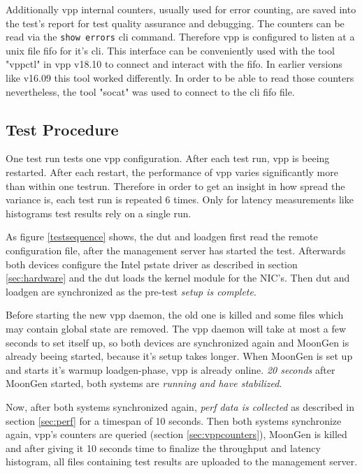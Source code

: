 Additionally \Ac{vpp} internal counters, usually used for error
counting, are saved into the test's report for test quality assurance
and debugging. The counters can be read via the \lstinline|show
errors|  \Ac{cli} command. Therefore \Ac{vpp} is configured to listen
at a unix file fifo for it's \Ac{cli}. This interface can be
conveniently used with the tool "vppctl" in \Ac{vpp} v18.10 to connect
and interact with the fifo. In earlier versions like v16.09 this tool
worked differently. In order to be able to read those counters
nevertheless, the tool "socat" was used to connect to the \Ac{cli}
fifo file.


\subsection{Test Procedure}

One test run tests one \Ac{vpp} configuration. After each test run,
\Ac{vpp} is beeing restarted. After each restart, the performance of
\Ac{vpp} varies significantly more than within one testrun. Therefore
in order to get an insight in how spread the variance is, each test
run is repeated 6 times. Only for latency measurements like histograms
test results rely on a single run.

As figure \ref{testsequence} shows, the \Ac{dut} and \Ac{loadgen}
first read the remote configuration file, after the management server
has started the test. Afterwards both devices configure the Intel
pstate driver  as described in section \ref{sec:hardware} and the
\Ac{dut} loads the kernel module for the NIC's. Then \Ac{dut} and
\Ac{loadgen} are synchronized as the pre-test \textit{setup is
complete}.

Before starting the new \Ac{vpp} daemon, the old one is killed and
some files which may contain global state are removed. The \Ac{vpp}
daemon will take at most a few seconds to set itself up, so both
devices are synchronized again and MoonGen is already beeing started,
because it's setup takes longer. When MoonGen is set up and starts
it's warmup loadgen-phase, \Ac{vpp} is already online. \textit{20
seconds} after MoonGen started, both systems are \textit{running and
have stabilized}.

Now, after both systems synchronized again, \textit{\Ac{perf} data is
collected} as described in section \ref{sec:perf} for a timespan of 10
seconds. Then both systems synchronize again, \Ac{vpp}'s counters are
queried (section \ref{sec:vppcounters}), MoonGen is killed and after
giving it 10 seconds time to finalize the throughput and latency
histogram, all files containing test results are uploaded to the
management server.

